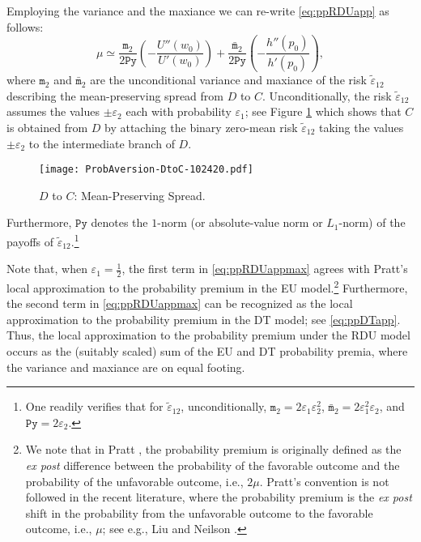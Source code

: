 \documentclass[11pt]{article}
\begin{document}
Employing the variance and the maxiance
we can re-write \eqref{eq:ppRDUapp} as follows:
\begin{equation}
\mu\simeq\frac{\texttt{m}_{2}}{2\texttt{Py}}\left(-\frac{U''(w_{0})}{U'(w_{0})}\right)
+\frac{\bar{\texttt{m}}_{2}}{2\texttt{Py}}\left(-\frac{h''(p_{0})}{h'(p_{0})}\right),
\label{eq:ppRDUappmax}
\end{equation}
where $\texttt{m}_{2}$ and $\bar{\texttt{m}}_{2}$ are the unconditional variance and maxiance of the risk $\tilde{\varepsilon}_{12}$
describing the mean-preserving spread from $D$ to $C$.
Unconditionally, the risk $\tilde{\varepsilon}_{12}$ assumes the values $\pm\varepsilon_{2}$ each with probability $\varepsilon_{1}$;
see Figure \ref{fig:DtoC}
which shows that $C$ is obtained from $D$ by attaching the binary zero-mean risk $\tilde{\varepsilon}_{12}$
taking the values $\pm\varepsilon_{2}$ to the intermediate branch of $D$.
\vskip 0.4cm
\begin{figure}[H]
\begin{center}
\caption{$D$ to $C$: Mean-Preserving Spread.
}
\vskip 0.4cm
\texttt{[image: ProbAversion-DtoC-102420.pdf]}
\label{fig:DtoC}
\end{center}
\end{figure}
\noindent Furthermore, $\texttt{Py}$ denotes the $1$-norm (or absolute-value norm or $L_{1}$-norm)
of the payoffs of $\tilde{\varepsilon}_{12}$.\footnote{One readily verifies that
for $\tilde{\varepsilon}_{12}$, unconditionally,
$\texttt{m}_{2}=2\varepsilon_{1}\varepsilon_{2}^{2}$, $\bar{\texttt{m}}_{2}=2\varepsilon_{1}^{2}\varepsilon_{2}$,
and $\texttt{Py}=2\varepsilon_{2}$.}

Note that, when $\varepsilon_{1}=\tfrac{1}{2}$, the first term in \eqref{eq:ppRDUappmax}
agrees with Pratt's \cite{P64} local approximation to the probability premium in the EU model.\footnote{We note that in Pratt \cite{P64},
the probability premium is originally defined as the \textit{ex post} difference between the probability of the favorable outcome
and the probability of the unfavorable outcome, i.e., $2\mu$.
Pratt's convention is not followed in the recent literature,
where the probability premium is the \textit{ex post} shift in the probability from the unfavorable outcome
to the favorable outcome, i.e., $\mu$;
see e.g., Liu and Neilson \cite{LN19}.}
Furthermore, the second term in \eqref{eq:ppRDUappmax} can be recognized as the local approximation to the probability premium
in the DT model; see \eqref{eq:ppDTapp}.
Thus, the local approximation to the probability premium under the RDU model occurs as the (suitably scaled) sum of the EU and DT probability premia,
where the variance and maxiance are on equal footing.
\end{document}
